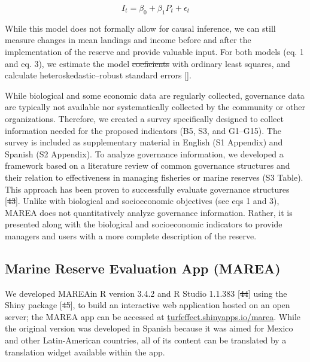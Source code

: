 \documentclass[12pt,]{article}
\providecommand{\DIFaddtex}[1]{{\protect\color{blue}\uwave{#1}}} %
\providecommand{\DIFdeltex}[1]{{\protect\color{red}\sout{#1}}}                      %
\providecommand{\DIFaddbegin}{} %
\providecommand{\DIFaddend}{} %
\providecommand{\DIFdelbegin}{} %
\providecommand{\DIFdelend}{} %
\providecommand{\DIFadd}[1]{\texorpdfstring{\DIFaddtex{#1}}{#1}} %
\providecommand{\DIFdel}[1]{\texorpdfstring{\DIFdeltex{#1}}{}} %
\newcommand{\DIFscaledelfig}{0.5}
\newlength{\DIFdelgraphicswidth} %
\newlength{\DIFdelgraphicsheight} %
\newcommand{\DIFaddincludegraphics}[2][]{{\color{blue}\fbox{\DIFOincludegraphics[#1]{#2}}}} %
\newcommand{\DIFdelincludegraphics}[2][]{%
\sbox{\DIFdelgraphicsbox}{\DIFOincludegraphics[#1]{#2}}%
\settoboxwidth{\DIFdelgraphicswidth}{\DIFdelgraphicsbox} %
\settoboxtotalheight{\DIFdelgraphicsheight}{\DIFdelgraphicsbox} %
\scalebox{\DIFscaledelfig}{%
\parbox[b]{\DIFdelgraphicswidth}{\usebox{\DIFdelgraphicsbox}\\[-\baselineskip] \rule{\DIFdelgraphicswidth}{0em}}\llap{\resizebox{\DIFdelgraphicswidth}{\DIFdelgraphicsheight}{%
\setlength{\unitlength}{\DIFdelgraphicswidth}%
\begin{picture}(1,1)%
\thicklines\linethickness{2pt} %
{\color[rgb]{1,0,0}\put(0,0){\framebox(1,1){}}}%
{\color[rgb]{1,0,0}\put(0,0){\line( 1,1){1}}}%
{\color[rgb]{1,0,0}\put(0,1){\line(1,-1){1}}}%
\end{picture}%
}\hspace*{3pt}}} %
} %
\DeclareRobustCommand{\DIFaddbegin}{\DIFOaddbegin \let\includegraphics\DIFaddincludegraphics} %
\DeclareRobustCommand{\DIFaddend}{\DIFOaddend \let\includegraphics\DIFOincludegraphics} %
\DeclareRobustCommand{\DIFdelbegin}{\DIFOdelbegin \let\includegraphics\DIFdelincludegraphics} %
\DeclareRobustCommand{\DIFdelend}{\DIFOaddend \let\includegraphics\DIFOincludegraphics} %
\begin{document}
\begin{equation}I_{t}=\beta_0 + \beta_1P_{t} + \epsilon_{t}\end{equation}

While this model does not formally allow for causal inference, we can
still measure changes in mean landings and income before and after the
implementation of the reserve and provide valuable input. For both
models (eq. 1 and eq. 3), we estimate the model \DIFdelbegin \DIFdel{coeficients }\DIFdelend \DIFaddbegin \DIFadd{coefficient }\DIFaddend with
ordinary least squares, and calculate heteroskedastic--robust standard
errors \DIFaddbegin {[}\DIFadd{49}{]}\DIFaddend .

While biological and some economic data are regularly collected,
governance data are typically not available nor systematically collected
by the community or other organizations. Therefore, we created a survey
specifically designed to collect information needed for the proposed
indicators (B5, S3, and G1--G15). The survey is included as
supplementary material in English (S1 Appendix) and Spanish (S2
Appendix). To analyze governance information, we developed a framework
based on a literature review of common governance structures and their
relation to effectiveness in managing fisheries or marine reserves (S3
Table). This approach has been proven to successfully evaluate
governance structures {[}\DIFdelbegin \DIFdel{43}\DIFdelend \DIFaddbegin \DIFadd{50}\DIFaddend {]}. Unlike with biological and socioeconomic
objectives (see eqs 1 and 3), MAREA does not quantitatively analyze
governance information. Rather, it is presented along with the
biological and socioeconomic indicators to provide managers and users
with a more complete description of the reserve.

\subsection{Marine Reserve Evaluation App
(MAREA)}\label{marine-reserve-evaluation-app-marea}

We developed MAREAin R version 3.4.2 and R Studio 1.1.383 {[}\DIFdelbegin \DIFdel{44}\DIFdelend \DIFaddbegin \DIFadd{51}\DIFaddend {]} using
the Shiny package {[}\DIFdelbegin \DIFdel{45}\DIFdelend \DIFaddbegin \DIFadd{52}\DIFaddend {]}, to build an interactive web application
hosted on an open server; the MAREA app can be accessed at
\href{turfeffect.shinyapps.io/marea/}{turfeffect.shinyapps.io/marea}.
While the original version was developed in Spanish because it was aimed
for Mexico and other Latin-American countries, all of its content can be
translated by a translation widget available within the app.
\end{document}
